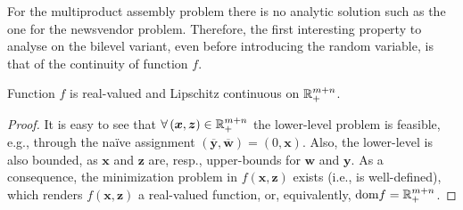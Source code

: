 \documentclass[12pt]{article}
\begin{document}
For the multiproduct assembly problem there is no analytic solution such as the one for the newsvendor problem.
Therefore, the first interesting property to analyse on the bilevel variant, even before introducing the random variable, is that of the continuity of function $f$.
\begin{lemma}\label{lemma:f-lip-cont}
    Function $f$ is real-valued and Lipschitz continuous on $\mathbb{R}^{m+n}_{+}$.
\end{lemma}
\begin{proof}
    It is easy to see that $\forall \left( \bm{x},\bm{z} \right) \in \mathbb{R}^{m+n}_{+}$ the lower-level problem is feasible, e.g., through the naïve assignment $(\overline{\bm{y}},\overline{\bm{w}})=(0,\bm{x})$.
    Also, the lower-level is also bounded, as $\bm{x}$ and $\bm{z}$ are, resp., upper-bounds for $\bm{w}$ and $\bm{y}$.
    As a consequence, the minimization problem in $f(\bm{x},\bm{z})$ exists (i.e., is well-defined), which renders $f(\bm{x},\bm{z})$ a real-valued function, or, equivalently, $\text{dom} f = \mathbb{R}^{m+n}_{+}$.


\end{proof}
\end{document}
